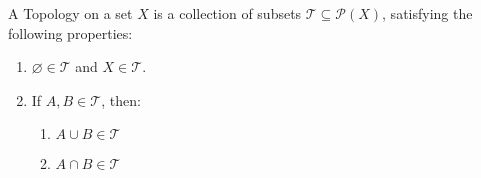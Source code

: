 \documentclass{article}
\begin{document}
  A Topology on a set $X$ is a collection of subsets $\mathcal{T}\subseteq \mathcal{P}(X)$, satisfying the
  following properties:
  \begin{enumerate}
    \item $\varnothing\in \mathcal{T}$ and $X\in \mathcal{T}$. 
    \item If $A,B\in \mathcal{T}$, then:
      \begin{enumerate}
        \item $A\cup B\in \mathcal{T}$
        \item $A\cap B\in \mathcal{T}$
      \end{enumerate}
  \end{enumerate}
\end{document}
